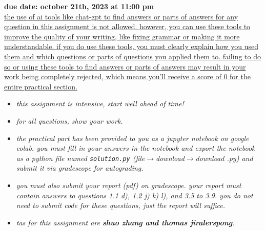 \documentclass[12pt]{article}
\theoremstyle{definition}
\begin{document}
\fancyhead{}
\fancyfoot{}


\vspace{1cm}

\shorthandoff{:}
{\textbf{due date: october 21th, 2023 at 11:00 pm}}\\

\vspace{-0.5cm}
\uline{the use of ai tools like chat-gpt to find answers or parts of answers for any question in this assignment is not allowed. however, you can use these tools to improve the quality of your writing, like fixing grammar or making it more understandable. if you do use these tools, you must clearly explain how you used them and which questions or parts of questions you applied them to. failing to do so or using these tools to find answers or parts of answers may result in your work being completely rejected, which means you'll receive a score of 0 for the entire practical section.}


\renewcommand{\labelitemi}{\textbullet}

\begin{itemize}
\item \emph{this assignment is intensive, start well ahead of time!}
\item \emph{for all questions, show your work.}
\item \emph{the practical part has been provided to you as a jupyter notebook on google colab. you must fill in your answers in the notebook and export the notebook as a python file named \texttt{solution.py} (file$\xrightarrow{}$download$\xrightarrow{}$download .py) and submit it via gradescope for autograding.}
\item \emph{you must also submit your report (pdf) on gradescope. your report must contain answers to questions 1.1 d), 1.2 j) k) l), and 3.5 to 3.9. you do not need to submit code for these questions, just the report will suffice.}
\item \emph{tas for this assignment are \textbf{shuo zhang and thomas jiralerspong}.}
\end{itemize}
\vspace{0.2cm}
\end{document}
